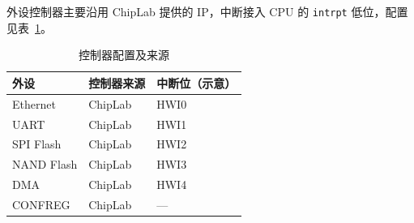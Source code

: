 外设控制器主要沿用 ChipLab 提供的 IP，中断接入 CPU 的 \texttt{intrpt} 低位，配置见表~\ref{tab:periph}。

\begin{table}[H]
\centering
\caption{控制器配置及来源}
\label{tab:periph}
\begin{tabular}{lll}
\toprule
外设 & 控制器来源 & 中断位（示意） \\
\midrule
Ethernet & ChipLab & HWI0 \\
UART & ChipLab & HWI1 \\
SPI Flash & ChipLab & HWI2 \\
NAND Flash & ChipLab & HWI3 \\
DMA & ChipLab & HWI4 \\
CONFREG & ChipLab & --- \\
\bottomrule
\end{tabular}
\end{table}
